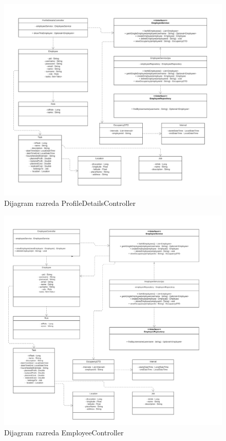 			
			\eject
			\begin{figure}[H]
					\centering
					\includegraphics[width=\textwidth]{slike/Dijagram razreda - ProfileDetailsController.jpg}
					\caption{Dijagram razreda ProfileDetailsController}
				\end{figure}
			
			
			\eject
			\begin{figure}[H]
					\centering
					\includegraphics[width=\textwidth]{slike/Dijagram razreda - EmployeeController.jpg}
					\caption{Dijagram razreda EmployeeController}
				\end{figure}
			
